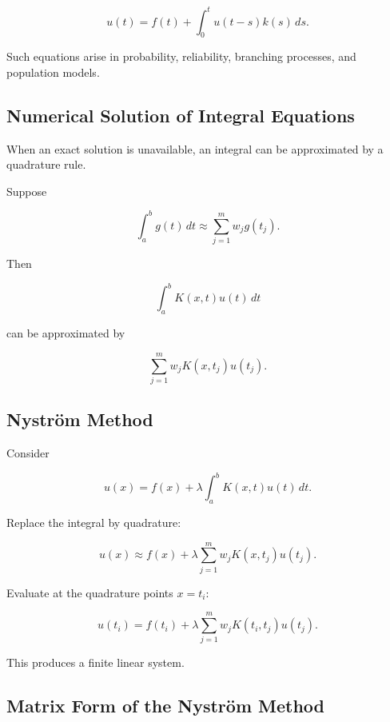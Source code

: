 \[
\boxed{
u(t)
=
f(t)
+
\int_0^t
u(t-s)k(s)\,ds.
}
\]

Such equations arise in probability, reliability, branching processes,
and population models.

\subsection{Numerical Solution of Integral Equations}
\label{subsec:numerical-integral-equations}

When an exact solution is unavailable, an integral can be approximated by
a quadrature rule.

Suppose

\[
\int_a^b
g(t)\,dt
\approx
\sum_{j=1}^{m}
w_jg(t_j).
\]

Then

\[
\int_a^b
K(x,t)u(t)\,dt
\]

can be approximated by

\[
\boxed{
\sum_{j=1}^{m}
w_j
K(x,t_j)
u(t_j).
}
\]

\subsection{Nystr\"om Method}
\label{subsec:nystrom-method}

Consider

\[
u(x)
=
f(x)
+
\lambda
\int_a^b
K(x,t)u(t)\,dt.
\]

Replace the integral by quadrature:

\[
\boxed{
u(x)
\approx
f(x)
+
\lambda
\sum_{j=1}^{m}
w_j
K(x,t_j)
u(t_j).
}
\]

Evaluate at the quadrature points \(x=t_i\):

\[
\boxed{
u(t_i)
=
f(t_i)
+
\lambda
\sum_{j=1}^{m}
w_j
K(t_i,t_j)
u(t_j).
}
\]

This produces a finite linear system.

\subsection{Matrix Form of the Nystr\"om Method}
\label{subsec:nystrom-matrix-form}

